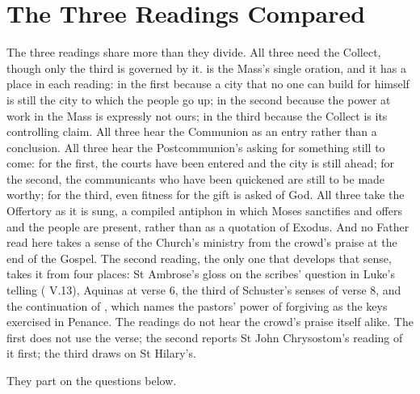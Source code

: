 \section{The Three Readings Compared}
\label{sec:comparison}

The three readings share more than they divide. All three need the Collect,
though only the third is governed by it.  is the Mass's single oration, and it has a place in each reading:
in the first because a city that no one can build for himself is still the
city to which the people go up; in the second because the power at work in the
Mass is expressly not ours; in the third because the Collect is its controlling
claim. All three hear the Communion as an entry rather than a conclusion. All
three hear the Postcommunion's  asking for something still to come: for the first, the courts have
been entered and the city is still ahead; for the second, the communicants who
have been quickened are still to be made worthy; for the third, even fitness for the
gift is asked of God. All three take the Offertory as it is sung, a compiled
antiphon in which Moses sanctifies and offers and the people are present,
rather than as a quotation of Exodus. And no Father read here takes a sense of
the Church's ministry from the crowd's praise at the end of the Gospel. The second reading, the only one that develops that sense, takes it
from four places: St Ambrose's gloss on the
scribes' question in Luke's telling ( V.13), Aquinas
at verse 6, the third of Schuster's senses of verse 8, and the continuation of
, which names the pastors' power of forgiving as the
keys exercised in Penance. The readings do not hear the crowd's praise itself
alike. The first does not use the verse; the second reports St John
Chrysostom's reading of it first; the third draws on St Hilary's.

They part on the questions below.


